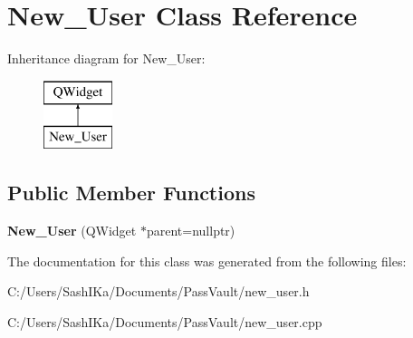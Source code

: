 \hypertarget{class_new___user}{}\section{New\+\_\+\+User Class Reference}
\label{class_new___user}
Inheritance diagram for New\+\_\+\+User\+:\begin{figure}[H]
\begin{center}
\leavevmode
\includegraphics[height=2.000000cm]{class_new___user}
\end{center}
\end{figure}
\subsection*{Public Member Functions}
\begin{DoxyCompactItemize}
\item 
\mbox{\label{class_new___user_adddc8d0f3f7de37990262367b979332c}} 
{\bfseries New\+\_\+\+User} (Q\+Widget $\ast$parent=nullptr)
\end{DoxyCompactItemize}


The documentation for this class was generated from the following files\+:\begin{DoxyCompactItemize}
\item 
C\+:/\+Users/\+Sash\+I\+Ka/\+Documents/\+Pass\+Vault/new\+\_\+user.\+h\item 
C\+:/\+Users/\+Sash\+I\+Ka/\+Documents/\+Pass\+Vault/new\+\_\+user.\+cpp\end{DoxyCompactItemize}
